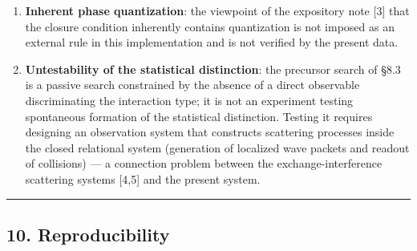 \documentclass[
  a4paper,
]{article}
\begin{document}
\begin{enumerate}
  without the eigenmode condition) is the next task.
\item
  \textbf{Inherent phase quantization}: the viewpoint of the expository
  note {[}3{]} that the closure condition inherently contains
  quantization is not imposed as an external rule in this implementation
  and is not verified by the present data.
\item
  \textbf{Untestability of the statistical distinction}: the precursor
  search of §8.3 is a passive search constrained by the absence of a
  direct observable discriminating the interaction type; it is not an
  experiment testing spontaneous formation of the statistical
  distinction. Testing it requires designing an observation system that
  constructs scattering processes inside the closed relational system
  (generation of localized wave packets and readout of collisions) --- a
  connection problem between the exchange-interference scattering
  systems {[}4,5{]} and the present system.
\end{enumerate}

\begin{center}\rule{0.5\linewidth}{0.5pt}\end{center}

\subsection{10. Reproducibility}\label{reproducibility}
\end{document}
